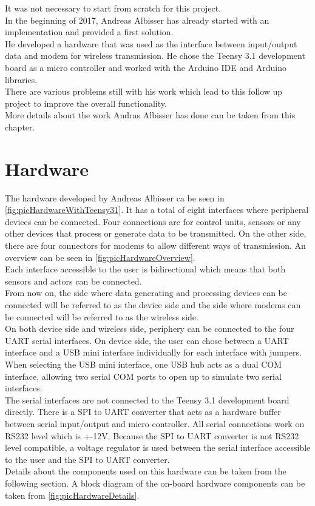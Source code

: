 %
%
It was not necessary to start from scratch for this project. \\
In the beginning of 2017, Andreas Albisser has already started with an implementation and provided a first solution. \\
He developed a hardware that was used as the interface between input/output data and modem for wireless transmission. He chose the Teensy 3.1 development board as a micro controller and worked with the Arduino IDE and Arduino libraries. \\
There are various problems still with his work which lead to this follow up project to improve the overall functionality.\\
More details about the work Andras Albisser has done can be taken from this chapter. \\
%
%
%
\section{Hardware}
%
The hardware developed by Andreas Albisser ca be seen in \autoref{fig:picHardwareWithTeensy31}. It has a total of eight interfaces where peripheral devices can be connected. Four connections are for control units, sensors or any other devices that process or generate data to be transmitted. On the other side, there are four connectors for modems to allow different ways of transmission. An overview can be seen in \autoref{fig:picHardwareOverview}.\\
%
Each interface accessible to the user is bidirectional which means that both sensors and actors can be connected.\\
From now on, the side where data generating and processing devices can be connected will be referred to as the device side and the side where modems can be connected will be referred to as the wireless side.\\
On both device side and wireless side, periphery can be connected to the four UART serial interfaces. On device side, the user can chose between a UART interface and a USB mini interface individually for each interface with jumpers. When selecting the USB mini interface, one USB hub acts as a dual COM interface, allowing two serial COM ports to open up to simulate two serial interfaces. \\
The serial interfaces are not connected to the Teensy 3.1 development board directly. There is a SPI to UART converter that acts as a hardware buffer between serial input/output and micro controller.
All serial connections work on RS232 level which is +-12V. Because the SPI to UART converter is not RS232 level compatible, a voltage regulator is used between the serial interface accessible to the user and the SPI to UART converter.\\
Details about the components used on this hardware can be taken from the following section.
A block diagram of the on-board hardware components can be taken from \autoref{fig:picHardwareDetails}.\\
%
%
